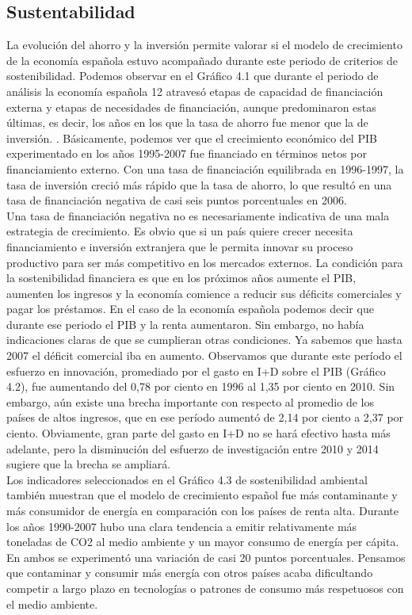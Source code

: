     \subsection{Sustentabilidad}
    La evolución del ahorro y la inversión permite valorar si el modelo de crecimiento de la economía española estuvo acompañado durante este periodo de criterios de sostenibilidad. Podemos observar en el Gráfico 4.1 que durante el periodo de análisis la economía española 12 atravesó etapas de capacidad de financiación externa y etapas de necesidades de financiación, aunque predominaron estas últimas, es decir, los años en los que la tasa de ahorro fue menor que la de inversión. . Básicamente, podemos ver que el crecimiento económico del PIB experimentado en los años 1995-2007 fue financiado en términos netos por financiamiento externo. Con una tasa de financiación equilibrada en 1996-1997, la tasa de inversión creció más rápido que la tasa de ahorro, lo que resultó en una tasa de financiación negativa de casi seis puntos porcentuales en 2006.\\
    Una tasa de financiación negativa no es necesariamente indicativa de una mala estrategia de crecimiento. Es obvio que si un país quiere crecer necesita financiamiento e inversión extranjera que le permita innovar su proceso productivo para ser más competitivo en los mercados externos. La condición para la sostenibilidad financiera es que en los próximos años aumente el PIB, aumenten los ingresos y la economía comience a reducir sus déficits comerciales y pagar los préstamos. En el caso de la economía española podemos decir que durante ese periodo el PIB y la renta aumentaron. Sin embargo, no había indicaciones claras de que se cumplieran otras condiciones. Ya sabemos que hasta 2007 el déficit comercial iba en aumento. Observamos que durante este período el esfuerzo en innovación, promediado por el gasto en I+D sobre el PIB (Gráfico 4.2), fue aumentando del 0,78 por ciento en 1996 al 1,35 por ciento en 2010. Sin embargo, aún existe una brecha importante con respecto al promedio de los países de altos ingresos, que en ese período aumentó de 2,14 por ciento a 2,37 por ciento. Obviamente, gran parte del gasto en I+D no se hará efectivo hasta más adelante, pero la disminución del esfuerzo de investigación entre 2010 y 2014 sugiere que la brecha se ampliará.\\
    Los indicadores seleccionados en el Gráfico 4.3 de sostenibilidad ambiental también muestran que el modelo de crecimiento español fue más contaminante y más consumidor de energía en comparación con los países de renta alta. Durante los años 1990-2007 hubo una clara tendencia a emitir relativamente más toneladas de CO2 al medio ambiente y un mayor consumo de energía per cápita. En ambos se experimentó una variación de casi 20 puntos porcentuales. Pensamos que contaminar y consumir más energía con otros países acaba dificultando competir a largo plazo en tecnologías o patrones de consumo más respetuosos con el medio ambiente.\\

